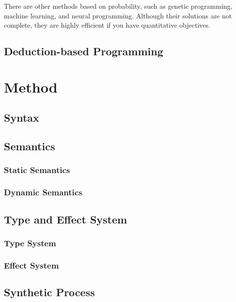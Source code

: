 \documentclass[12pt, a4paper, titlepage]{report}
\begin{document}
    There are other methods based on probability, such as genetic programming, machine learning, and neural programming.
    Although their solutions are not complete, they are highly efficient if you have quantitative objectives.

  \section{Deduction-based Programming}


\chapter{Method}\label{chapter:method}
  \section{Syntax}
  \section{Semantics}
    \subsection{Static Semantics} %
    \subsection{Dynamic Semantics} %
  \section{Type and Effect System}
    \subsection{Type System}
    \subsection{Effect System}
  \section{Synthetic Process}\label{section:syntheticProcess}

\end{document}
